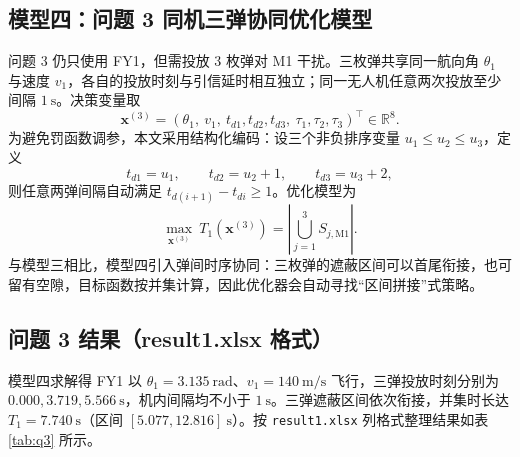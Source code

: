 \documentclass[11pt,a4paper]{ctexart}
\begin{document}
\subsection{模型四：问题 3 同机三弹协同优化模型}

问题 3 仍只使用 FY1，但需投放 3 枚弹对 M1 干扰。三枚弹共享同一航向角 $\theta_1$ 与速度 $v_1$，各自的投放时刻与引信延时相互独立；同一无人机任意两次投放至少间隔 $1~\mathrm{s}$。决策变量取
\begin{equation}
  \bm{x}^{(3)}=\left(\theta_1,\ v_1,\ t_{d1},t_{d2},t_{d3},\ \tau_1,\tau_2,\tau_3\right)^\top
  \in\mathbb{R}^8.
  \label{eq:x3}
\end{equation}
为避免罚函数调参，本文采用结构化编码：设三个非负排序变量 $u_1\le u_2\le u_3$，定义
\begin{equation}
  t_{d1}=u_1,\qquad t_{d2}=u_2+1,\qquad t_{d3}=u_3+2,
  \label{eq:spacing}
\end{equation}
则任意两弹间隔自动满足 $t_{d(i+1)}-t_{di}\ge 1$。优化模型为
\begin{equation}
  \max_{\bm{x}^{(3)}}\ T_1(\bm{x}^{(3)})=\left|\bigcup_{j=1}^{3}S_{j,\mathrm{M1}}\right|.
  \label{eq:obj3}
\end{equation}
与模型三相比，模型四引入弹间时序协同：三枚弹的遮蔽区间可以首尾衔接，也可留有空隙，目标函数按并集计算，因此优化器会自动寻找“区间拼接”式策略。

\subsection{问题 3 结果（result1.xlsx 格式）}

模型四求解得 FY1 以 $\theta_1=3.135~\mathrm{rad}$、$v_1=140~\mathrm{m/s}$ 飞行，三弹投放时刻分别为 $0.000,\allowbreak 3.719,\allowbreak 5.566~\mathrm{s}$，机内间隔均不小于 $1~\mathrm{s}$。三弹遮蔽区间依次衔接，并集时长达 $T_1=7.740~\mathrm{s}$（区间 $[5.077,\allowbreak 12.816]~\mathrm{s}$）。按 \texttt{result1.xlsx} 列格式整理结果如表 \ref{tab:q3} 所示。
\end{document}

